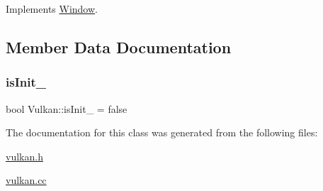 Implements \mbox{\hyperlink{classWindow_ae770439748fb6b7dcdb3071860e687b3}{Window}}.



\subsection{Member Data Documentation}
\mbox{\label{classVulkan_aa19833e837744cc2f6b1f93c1d66a693}} 
\subsubsection{\texorpdfstring{is\+Init\+\_\+}{isInit\_}}
{\footnotesize\ttfamily bool Vulkan\+::is\+Init\+\_\+ = false\hspace{0.3cm}{\ttfamily [private]}}



The documentation for this class was generated from the following files\+:\begin{DoxyCompactItemize}
\item 
\mbox{\hyperlink{vulkan_8h}{vulkan.\+h}}\item 
\mbox{\hyperlink{vulkan_8cc}{vulkan.\+cc}}\end{DoxyCompactItemize}
